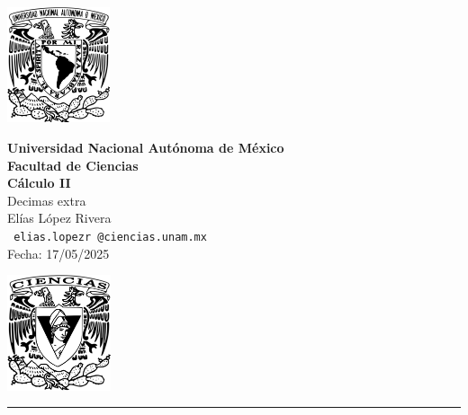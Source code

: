 \documentclass[11pt,letterpaper]{article}
\begin{document}

\begin{center}
    \begin{minipage}{3cm}
    	\begin{center}
    		\includegraphics[height=3.4cm]{logo_unam.png}
    	\end{center}
    \end{minipage}\hfill
    \begin{minipage}{10cm}
    	\begin{center}
    	\textbf{\large Universidad Nacional Autónoma de México}\\[0.1cm]
        \textbf{Facultad de Ciencias}\\[0.1cm]
        \textbf{C\'alculo II}\\[0.1cm]
        Decimas extra\\[0.1cm]
         El\'ias L\'opez Rivera\\[0.1cm]
        \texttt{ elias.lopezr\,@ciencias.unam.mx }\\[0.1cm]
        Fecha:\,\,17/05/2025
    	\end{center}
    \end{minipage}\hfill
    \begin{minipage}{3cm}
    	\begin{center}
    		\includegraphics[height=3.4cm]{Logo_FC.png}
    	\end{center}
    \end{minipage}
\end{center}

\rule{17cm}{0.1mm}
\end{document}
